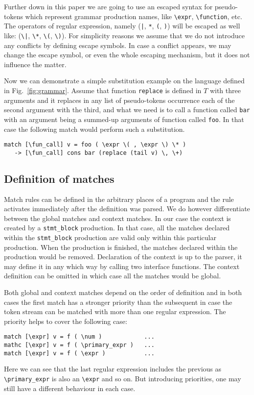 Further down in this paper we are going to use an escaped syntax 
for pseudo-tokens which represent grammar production names, like
\verb|\expr|, \verb|\function|, etc.  The operators of regular
expression, namely (\verb/|/, \verb|*|, \verb|(|, \verb|)|) will
be escaped as well like: (\verb/\|/, \verb|\*|, \verb|\(|, \verb|\)|).
For simplicity reasons we assume that we do not introduce
any conflicts by defining escape symbols.  In case a conflict 
appears, we may change the escape symbol, or even the whole escaping
mechanism, but it does not influence the matter.

Now we can demonstrate a simple substitution example on the language
defined in Fig.~\ref{fig:grammar}.  Assume that function \verb|replace|
is defined in $T$ with three arguments and it replaces in any list 
of pseudo-tokens occurrence each of the second argument with the third, 
and what we need is to call a function called \verb|bar| with an 
argument being a summed-up arguments of function called \verb|foo|.
In that case the following match would perform such a substitution.
\begin{verbatim}
match [\fun_call] v = foo ( \expr \( , \expr \) \* )
   -> [\fun_call] cons bar (replace (tail v) \, \+)
\end{verbatim}

\subsection{Definition of matches}
Match rules can be defined in the arbitrary places of a program
and the rule activates immediately after the definition was parsed.
We do however differentiate between the global matches and context
matches.  In our case the context is created by a \verb|stmt_block|
production.  In that case, all the matches declared within the 
\verb|stmt_block| production are valid only within this particular
production.  When the production is finished, the matches declared
within the production would be removed.  Declaration of the context
is up to the parser, it may define it in any which way by calling 
two interface functions.  The context definition can be omitted in
which case all the matches would be global.

Both global and context matches depend on the order of definition
and in both cases the first match has a stronger priority than the
subsequent in case the token stream can be matched with more than
one regular expression.  The priority helps to cover the following
case:
\begin{verbatim}
match [\expr] v = f ( \num )            ...
mathc [\expr] v = f ( \primary_expr )   ...
match [\expr] v = f ( \expr )           ...
\end{verbatim}
Here we can see that the last regular expression includes the 
previous as \verb|\primary_expr| is also an \verb|\expr| and
so on.  But introducing priorities, one may still have a different
behaviour in each case.

